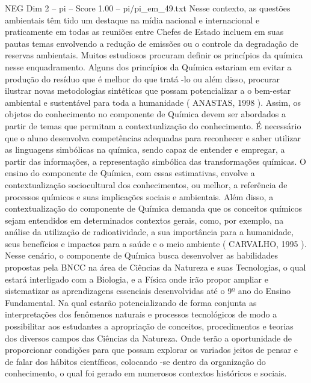 \begin{textsample}{NEG Dim 2 – pi – Score 1.00 – pi/pi\_em\_49.txt}
Nesse contexto, as questões ambientais têm tido um destaque na mídia nacional e internacional e praticamente em todas as reuniões entre Chefes de Estado incluem em suas pautas temas envolvendo a redução de emissões ou o controle da degradação de reservas ambientais.
Muitos estudiosos procuram definir os princípios da química nesse enquadramento.
Alguns dos princípios da Química estariam em evitar a produção do resíduo que é melhor do que tratá -lo ou além disso, procurar ilustrar novas metodologias sintéticas que possam potencializar a o bem-estar ambiental e sustentável para toda a humanidade ( ANASTAS, 1998 ).
Assim, os objetos do conhecimento no componente de Química devem ser abordados a partir de temas que permitam a contextualização do conhecimento.
É necessário que o aluno desenvolva competências adequadas para reconhecer e saber utilizar as linguagens simbólicas na química, sendo capaz de entender e empregar, a partir das informações, a representação simbólica das transformações químicas.
O ensino do componente de Química, com essas estimativas, envolve a contextualização sociocultural dos conhecimentos, ou melhor, a referência de processos químicos e suas implicações sociais e ambientais.
Além disso, a contextualização do componente de Química demanda que os conceitos químicos sejam entendidos em determinados contextos gerais, como, por exemplo, na análise da utilização de radioatividade, a sua importância para a humanidade, seus benefícios e impactos para a saúde e o meio ambiente ( CARVALHO, 1995 ).
Nesse cenário, o componente de Química busca desenvolver as habilidades propostas pela BNCC na área de Ciências da Natureza e suas Tecnologias, o qual estará interligado com a Biologia, e a Física onde irão propor ampliar e sistematizar as aprendizagens essenciais desenvolvidas até o 9º ano do Ensino Fundamental.
Na qual estarão potencializando de forma conjunta as interpretações dos fenômenos naturais e processos tecnológicos de modo a possibilitar aos estudantes a apropriação de conceitos, procedimentos e teorias dos diversos campos das Ciências da Natureza.
Onde terão a oportunidade de proporcionar condições para que possam explorar os variados jeitos de pensar e de falar dos hábitos científicos, colocando -se dentro da organização do conhecimento, o qual foi gerado em numerosos contextos históricos e sociais.

\end{textsample}
